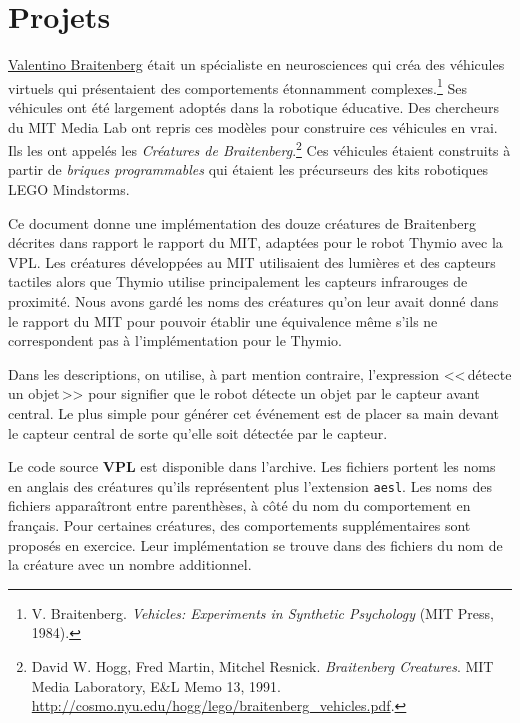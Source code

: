\part{Projets}



\href{http://fr.wikipedia.org/wiki/Valentino_Braitenberg}{Valentino Braitenberg}
était un spécialiste en neurosciences qui créa des véhicules virtuels
qui présentaient des comportements étonnamment complexes.\footnote{V. Braitenberg.
\textit{Vehicles: Experiments in Synthetic Psychology} (MIT Press, 1984).}
Ses véhicules ont été largement adoptés dans la robotique éducative.
Des chercheurs du MIT Media Lab ont repris ces modèles pour construire ces véhicules en vrai.
Ils les ont appelés les \emph{Créatures de Braitenberg}.\footnote{David W. Hogg, Fred Martin,
Mitchel Resnick. \textit{Braitenberg Creatures}. MIT Media Laboratory, E\&L Memo 13, 1991.
\href{http://cosmo.nyu.edu/hogg/lego/braitenberg_vehicles.pdf}{http://cosmo.nyu.edu/hogg/lego/braitenberg\_vehicles.pdf}.}
Ces véhicules étaient construits à partir de \emph{briques programmables} qui étaient les
précurseurs des kits robotiques LEGO Mindstorms.

Ce document donne une implémentation des douze créatures de Braitenberg décrites dans
rapport le rapport du MIT, adaptées pour le robot Thymio avec la VPL.
Les créatures développées au MIT utilisaient des lumières et des capteurs tactiles
alors que Thymio utilise principalement les capteurs infrarouges de proximité.
Nous avons gardé les noms des créatures
qu'on leur avait donné dans le rapport du MIT pour pouvoir établir une équivalence même s'ils ne correspondent pas à l'implémentation pour le Thymio.

Dans les descriptions, on utilise, à part mention contraire,
l'expression <<\,détecte un objet\,>> pour signifier
que le robot détecte un objet par le capteur avant central.
Le plus simple pour générer cet événement est de placer sa main
devant le capteur central
de sorte qu'elle soit détectée par le capteur.

Le code source \textbf{VPL} est disponible dans l'archive.
Les fichiers portent les noms en anglais des créatures qu'ils représentent
plus l'extension \texttt{\small aesl}.
Les noms des fichiers apparaîtront entre parenthèses, à côté du nom du comportement en français.
Pour certaines créatures, des comportements supplémentaires sont proposés en exercice.
Leur implémentation se trouve dans des fichiers du nom de la créature avec un nombre additionnel.

